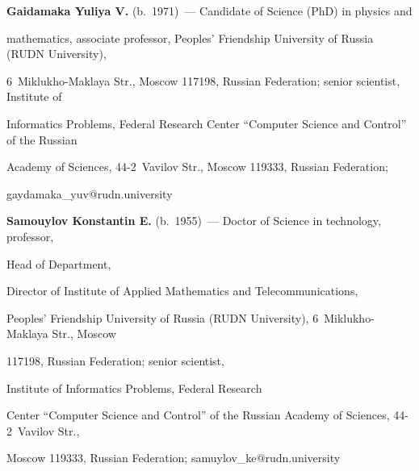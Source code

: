 




\Contr





\noindent


\textbf{Gaidamaka Yuliya V.} (b.\ 1971)~--- Candidate of Science (PhD) in physics and 


mathematics, associate professor, Peoples' Friendship University of Russia (RUDN University), 


6~Miklukho-Maklaya Str., Moscow 117198, Russian Federation; senior scientist, Institute of 


Informatics Problems, Federal Research Center ``Computer Science and Control'' of the Russian 


Academy of Sciences, 44-2~Vavilov Str., Moscow 119333, Russian Federation; 


\mbox{gaydamaka\_yuv@rudn.university}





\vspace*{3pt}





\noindent


\textbf{Samouylov Konstantin E.} (b.\ 1955)~--- Doctor of Science in technology, professor, 


Head of Department, 


Director of Institute of Applied Mathematics and Telecommunications, 


Peoples' Friendship University of Russia (RUDN University), 6~Miklukho-Maklaya Str., Moscow 


117198, Russian Federation; senior scientist,


 Institute of Informatics Problems, Federal Research 


Center ``Computer Science and Control'' of the Russian Academy of Sciences, 44-2~Vavilov Str., 


Moscow 119333, Russian Federation; \mbox{samuylov\_ke@rudn.university}





\vspace*{3pt}





\noindent


